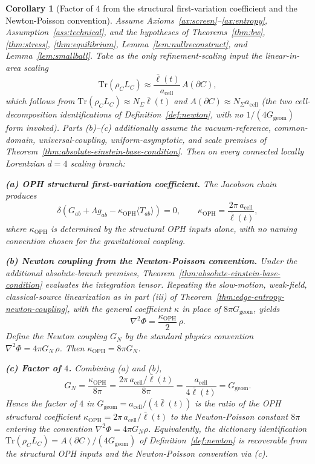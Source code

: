\documentclass[11pt]{article}
\newtheorem{corollary}[theorem]{Corollary}
\begin{document}
\begin{corollary}[Factor of \(4\) from the structural first-variation coefficient and the Newton-Poisson convention]\label{cor:factor-of-four-derived}
Assume Axioms~\ref{ax:screen}--\ref{ax:entropy}, Assumption~\ref{ass:technical}, and the hypotheses of Theorems~\ref{thm:bw}, \ref{thm:stress}, \ref{thm:equilibrium}, Lemma~\ref{lem:nullreconstruct}, and Lemma~\ref{lem:smallball}. Take as the only refinement-scaling input the linear-in-area scaling
\[
\mathrm{Tr}(\rho_C L_C)\approx\frac{\bar\ell(t)}{a_{\mathrm{cell}}}\,A(\partial C),
\]
which follows from \(\mathrm{Tr}(\rho_C L_C)\approx N_\Sigma\bar\ell(t)\) and \(A(\partial C)\approx N_\Sigma a_{\mathrm{cell}}\) (the two cell-decomposition identifications of Definition~\ref{def:newton}, with no \(1/(4G_{\mathrm{geom}})\) form invoked). Parts (b)--(c) additionally assume the vacuum-reference, common-domain, universal-coupling, uniform-asymptotic, and scale premises of Theorem~\ref{thm:absolute-einstein-base-condition}. Then on every connected locally Lorentzian \(d=4\) scaling branch:

\textbf{(a) OPH structural first-variation coefficient.} The Jacobson chain produces
\[
\delta\!\left(G_{ab}+\Lambda g_{ab}
-\kappa_{\mathrm{OPH}}\langle T_{ab}\rangle\right)=0,
\qquad
\kappa_{\mathrm{OPH}}=\frac{2\pi\,a_{\mathrm{cell}}}{\bar\ell(t)},
\]
where \(\kappa_{\mathrm{OPH}}\) is determined by the structural OPH inputs alone, with no naming convention chosen for the gravitational coupling.

\textbf{(b) Newton coupling from the Newton-Poisson convention.} Under the
additional absolute-branch premises, Theorem~\ref{thm:absolute-einstein-base-condition}
evaluates the integration tensor. Repeating the slow-motion, weak-field,
classical-source linearization as in part (iii) of
Theorem~\ref{thm:edge-entropy-newton-coupling}, with the general coefficient
\(\kappa\) in place of \(8\pi G_{\mathrm{geom}}\), yields
\[
\nabla^2\Phi=\frac{\kappa_{\mathrm{OPH}}}{2}\,\rho.
\]
Define the Newton coupling \(G_N\) by the standard physics convention \(\nabla^2\Phi=4\pi G_N\,\rho\). Then \(\kappa_{\mathrm{OPH}}=8\pi G_N\).

\textbf{(c) Factor of \(4\).} Combining (a) and (b),
\[
G_N=\frac{\kappa_{\mathrm{OPH}}}{8\pi}=\frac{2\pi\,a_{\mathrm{cell}}/\bar\ell(t)}{8\pi}=\frac{a_{\mathrm{cell}}}{4\bar\ell(t)}=G_{\mathrm{geom}}.
\]
Hence the factor of \(4\) in \(G_{\mathrm{geom}}=a_{\mathrm{cell}}/(4\bar\ell(t))\) is the ratio of the OPH structural coefficient \(\kappa_{\mathrm{OPH}}=2\pi\,a_{\mathrm{cell}}/\bar\ell(t)\) to the Newton-Poisson constant \(8\pi\) entering the convention \(\nabla^2\Phi=4\pi G_N\rho\). Equivalently, the dictionary identification \(\mathrm{Tr}(\rho_C L_C)=A(\partial C)/(4G_{\mathrm{geom}})\) of Definition~\ref{def:newton} is recoverable from the structural OPH inputs and the Newton-Poisson convention via (c).
\end{corollary}
\end{document}
